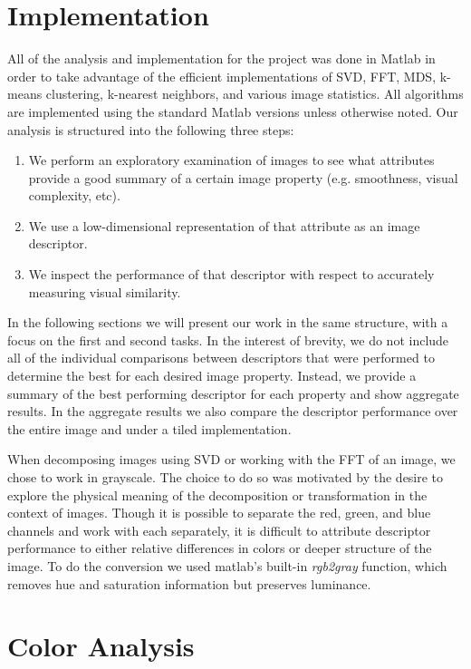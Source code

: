 \documentclass{report}
\begin{document}
\section{Implementation}
All of the analysis and implementation for the project was done in Matlab in order to take advantage of the efficient implementations of SVD, FFT, MDS, k-means clustering, k-nearest neighbors, and various image statistics. All algorithms are implemented using the standard Matlab versions unless otherwise noted. Our analysis is structured into the following three steps:
\begin{enumerate}
  \item We perform an exploratory examination of images to see what attributes provide a good summary of a certain image property (e.g. smoothness, visual complexity, etc).
  \item We use a low-dimensional representation of that attribute as an image descriptor.
  \item We inspect the performance of that descriptor with respect to accurately measuring visual similarity.
\end{enumerate}
In the following sections we will present our work in the same structure, with a focus on the first and second tasks. In the interest of brevity, we do not include all of the individual comparisons between descriptors that were performed to determine the best for each desired image property. Instead, we provide a summary of the best performing descriptor for each property and show aggregate results. In the aggregate results we also compare the descriptor performance over the entire image and under a tiled implementation.

When decomposing images using SVD or working with the FFT of an image, we chose to work in grayscale. The choice to do so was motivated by the desire to explore the physical meaning of the decomposition or transformation in the context of images. Though it is possible to separate the red, green, and blue channels and work with each separately, it is difficult to attribute descriptor performance to either relative differences in colors or deeper structure of the image. To do the conversion we used matlab's built-in \textit{rgb2gray} function, which removes hue and saturation information but preserves luminance.

\section{Color Analysis}
\label{sec:color}
\end{document}
